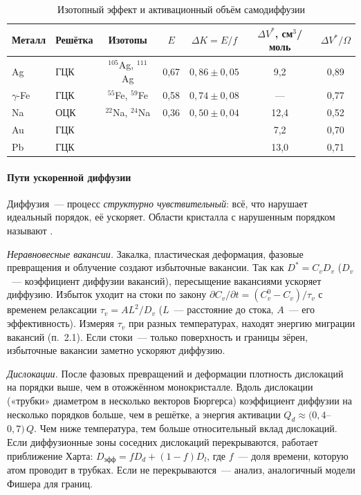 \begin{table}[ht]
\centering
\caption{Изотопный эффект и активационный объём самодиффузии}
\label{tab:isotope}
\small
\begin{tabular}{@{}llccccc@{}}
\toprule
Металл & Решётка & Изотопы & $E$ & $\Delta K=E/f$ & $\Delta V^*$, см$^3$/моль & $\Delta V^*/\Omega$ \\
\midrule
Ag & ГЦК & $^{105}$Ag, $^{111}$Ag & 0,67 & $0{,}86\pm0{,}05$ & 9,2 & 0,89 \\
$\gamma$-Fe & ГЦК & $^{55}$Fe, $^{59}$Fe & 0,58 & $0{,}74\pm0{,}08$ & --- & 0,77 \\
Na & ОЦК & $^{22}$Na, $^{24}$Na & 0,36 & $0{,}50\pm0{,}04$ & 12,4 & 0,52 \\
Au & ГЦК & & & & 7,2 & 0,70 \\
Pb & ГЦК & & & & 13,0 & 0,71 \\
\bottomrule
\end{tabular}
\end{table}

\paragraph{Пути ускоренной диффузии}
Диффузия~— процесс \emph{структурно чувствительный}: всё, что нарушает
идеальный порядок, её ускоряет. Области кристалла с нарушенным порядком
называют .

\emph{Неравновесные вакансии.} Закалка, пластическая деформация,
фазовые превращения и облучение создают избыточные вакансии. Так как
$D^*=C_vD_v$ ($D_v$~— коэффициент диффузии вакансий), пересыщение
вакансиями ускоряет диффузию. Избыток уходит на стоки по закону
$\partial C_v/\partial t=(C_v^0-C_v)/\tau_v$ с временем релаксации
$\tau_v=AL^2/D_v$ ($L$~— расстояние до стока, $A$~— его эффективность).
Измеряя $\tau_v$ при разных температурах, находят энергию миграции
вакансий (п.~2.1). Если стоки~— только поверхность и границы зёрен,
избыточные вакансии заметно ускоряют диффузию.

\emph{Дислокации.} После фазовых превращений и деформации плотность
дислокаций на порядки выше, чем в отожжённом монокристалле. Вдоль
дислокации («трубки» диаметром в несколько векторов Бюргерса)
коэффициент диффузии на несколько порядков больше, чем в решётке, а
энергия активации $Q_d\approx(0{,}4$--$0{,}7)\,Q$. Чем ниже температура, тем
больше относительный вклад дислокаций. Если диффузионные зоны соседних
дислокаций перекрываются, работает приближение Харта:
$D_\text{эфф}=fD_d+(1-f)D_l$, где $f$~— доля времени, которую атом
проводит в трубках. Если не перекрываются~— анализ, аналогичный модели
Фишера для границ.

